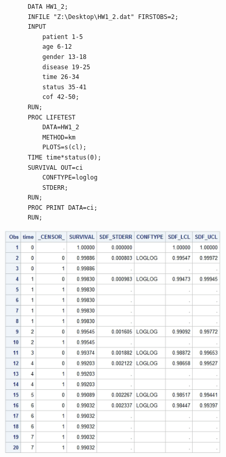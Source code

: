 \documentclass[12pt]{elegantbook}
\begin{document}
    \begin{solution}
        \begin{verbatim}
            DATA HW1_2;
            INFILE "Z:\Desktop\HW1_2.dat" FIRSTOBS=2;
            INPUT 
                patient 1-5 
                age 6-12 
                gender 13-18 
                disease 19-25
                time 26-34
                status 35-41
                cof 42-50;
            RUN;
            PROC LIFETEST 
                DATA=HW1_2 
                METHOD=km 
                PLOTS=s(cl);
            TIME time*status(0);
            SURVIVAL OUT=ci 
                CONFTYPE=loglog 
                STDERR;
            RUN;
            PROC PRINT DATA=ci;
            RUN;
        \end{verbatim}
        \begin{figure}[H]
            \centering
            \includegraphics[width=\textwidth]{HW1_3.png}
        \end{figure}
    \end{solution}
    
\end{document}
